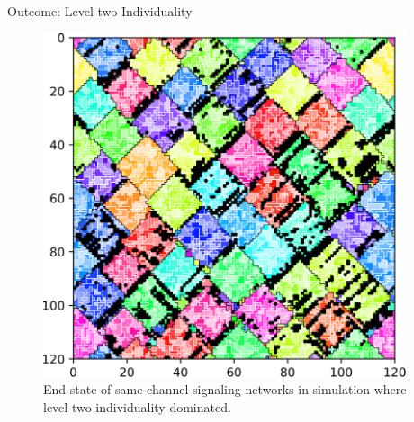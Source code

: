 \begin{frame}{Outcome: Level-two Individuality}
\begin{figure}
\begin{columns}
\begin{column}{0.6\textwidth}
\includegraphics[width=\textwidth]{img/results/ChannelMap_1047_update19500000.png}
\end{column}
\begin{column}{0.4\textwidth}
\caption{
End state of same-channel signaling networks in simulation where level-two individuality dominated.
}
\end{column}
\end{columns}
\end{figure}
\end{frame}


